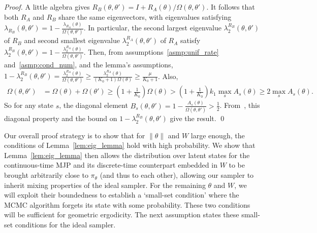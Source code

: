 \begin{proof}
A little algebra gives $R_B(\theta,\theta') = I + R_A(\theta)/\Omega(\theta,\theta')$. It 
follows that both $R_A$ and $R_B$ share the same eigenvectors, with 
eigenvalues satisfying 
$\lambda_{R_B}(\theta, \theta') = 1 - \frac{\lambda_{R_A}(\theta)}{\Omega(\theta,
\theta')}$. In particular, the second largest eigenvalue 
$\lambda_2^{R_B}(\theta,\theta')$ of $R_B$ and  
second smallest eigenvalue $\lambda^{R_A}_2(\theta,\theta')$ of $R_A$ satisfy  
$\lambda^{R_B}_2(\theta,\theta') = 1 - \frac{\lambda^{R_A}_2(\theta)}{\Omega(\theta, \theta')}$.
Then, from assumptions~\ref{asmp:unif_rate} and~\ref{asmp:cond_num}, and 
the lemma's assumptions, 
$1 - \lambda^{R_B}_2(\theta,\theta') = \frac{\lambda^{R_A}_2(\theta)}{\Omega(\theta, \theta')} 
\ge \frac{\lambda^{R_A}_2(\theta)}{(K_0+1)\Omega(\theta)} 
\ge \frac{\mu}{K_0+1} $. 
Also, 
\begin{align*}
\Omega(\theta, \theta') &= \Omega(\theta) + \Omega(\theta') \ge (1 + \frac{1}{K_0})\Omega(\theta)
 > (1 + \frac{1}{K_0})k_1\max_s A_{s}(\theta) \ge 2\max_s A_{s}(\theta). %
\end{align*}
So for any state $s$, the diagonal element $B_s(\theta, \theta') = 1 - 
\frac{A_s(\theta)}{\Omega(\theta, \theta')}> \frac{1}{2}$.
From~\cite{fill1991}, this diagonal property and the bound 
on $1-\lambda_2^{R_B}(\theta,\theta')$ give the result.
\qed
\end{proof}

Our overall proof strategy is to show that for {$\| \theta \|$} and $W$ large 
enough, the conditions of Lemma~\ref{lem:eig_lemma} hold with 
high probability. We show that Lemma~\ref{lem:eig_lemma} then allows the 
distribution over latent states for the continuous-time MJP and its 
discrete-time counterpart embedded in $W$ to be brought arbitrarily 
close to $\pi_\theta$ (and thus to each other), allowing our sampler 
to inherit mixing properties of the ideal sampler. For the remaining 
$\theta$ and $W$, we will exploit their boundedness to establish a 
`small-set condition' where the MCMC algorithm forgets its state with 
some probability. These two conditions will be sufficient for 
geometric ergodicity. The next assumption states these small-set conditions 
for the ideal sampler.

